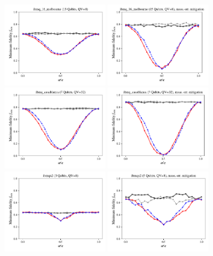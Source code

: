 \documentclass[a4paper]{article}
\begin{document}
\begin{figure}[H]
	\centering
	\includegraphics[width=0.4\textwidth]{fmin_qc4_mit1}
	\includegraphics[width=0.4\textwidth]{fmin_qc4_mit0}
	\includegraphics[width=0.4\textwidth]{fmin_qc5_mit1}
	\includegraphics[width=0.4\textwidth]{fmin_qc5_mit0}
	\includegraphics[width=0.4\textwidth]{fmin_qc6_mit1}
	\includegraphics[width=0.4\textwidth]{fmin_qc6_mit0}

\end{figure}
\end{document}
